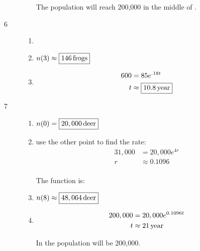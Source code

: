 \documentclass{exam}
\begin{document}
\begin{description}
\begin{enumerate}[a]
            The population will reach 200,000 in the middle of . 

        \end{enumerate}

      \item[6] 
        \begin{enumerate}[a]
          \item {}

          \item $n(3) \approx \boxed{\unit[146]{frogs}}$

          \item 
            \begin{align*}
              600 & = 85 e^{.18t} \\
              t   & \approx \boxed{\unit[10.8]{year}} \\
            \end{align*}

        \end{enumerate}

      \item[7] 
        \begin{enumerate}[a]
          \item $n(0) = \boxed{\unit[20,000]{deer}}$

          \item use the other point to find the rate:
            \begin{align*}
              31,000 & = 20,000 e^{4r} \\
              r      & \approx 0.1096 \\
            \end{align*}

            The function is: 

          \item $n(8) \approx \boxed{\unit[48,064]{deer}}$

          \item 
            \begin{align*}
              200,000 & = 20,000 e^{0.1096 t} \\
              t       & \approx \unit[21]{year} \\
            \end{align*}

            In  the population will be 200,000.

        \end{enumerate}


\end{description}
\end{document}
